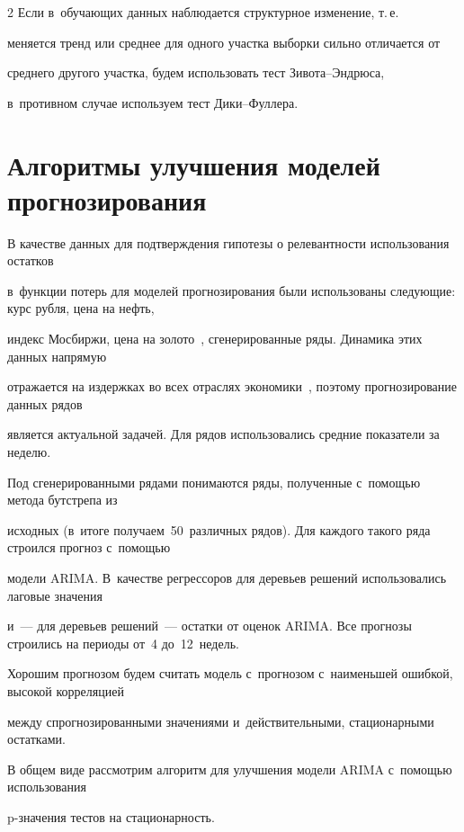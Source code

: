 \begin{multicols}{2}
Если в~обуча\-ющих данных наблюдается структурное изменение, т.\,е.\ 

меняется тренд или среднее для одного участка выборки сильно отличается от 

среднего другого участка, будем использовать тест Зи\-во\-та--Энд\-рю\-са, 

в~противном случае используем тест Ди\-ки--Фул\-лера.



\vspace*{-2pt}



\section{Алгоритмы улучшения моделей прогнозирования}



В качестве данных для подтверждения гипотезы о релевантности использования остатков 

в~функции потерь для моделей прогнозирования были использованы следующие: курс рубля, цена на нефть, 

индекс Мосбиржи, цена на золото~\cite{23-kr}, сгенерированные ряды. Динамика этих данных напрямую 

отражается на издержках во всех отраслях экономики~\cite{24-kr}, поэтому прогнозирование данных рядов 

является актуальной задачей. Для рядов использовались средние показатели за неделю. 

Под сгенерированными рядами понимаются ряды, полученные с~по\-мощью метода бутстрепа из 

исходных (в~итоге получаем~50~различных рядов). Для каждого такого ряда строился прогноз с~по\-мощью 

модели ARIMA. В~качестве регрессоров для деревьев решений использовались лаговые значения 

и~--- для деревьев решений~--- остатки от оценок ARIMA. Все прогнозы строились на периоды от~4 до~12~недель. 

Хорошим прогнозом будем считать модель с~прогнозом с~наименьшей ошибкой, высокой корреляцией 

между спрогнозированными значениями и~действительными, стационарными остатками.



В общем виде рассмотрим алгоритм для улучшения модели ARIMA с~помощью использования

 p-зна\-че\-ния тес\-тов на ста\-цио\-нар\-ность.


\end{multicols}

